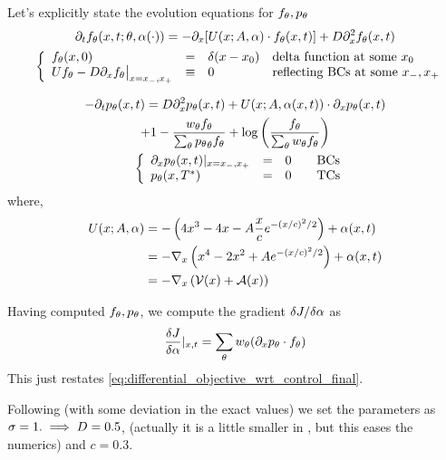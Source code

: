 \documentclass{article}
\begin{document}
Let's explicitly state the evolution equations for ${ f_{\theta}},{ p_{\theta}}$
\begin{equation}
\begin{gathered}
{\partial}_t { f_{\theta}}(x,t; {\theta}, {\alpha}(\cdot)) = -{\partial}_x [ U(x;A, {\alpha}) \cdot { f_{\theta}}(x,t)] + D {\partial}_x^2
{ f_{\theta}}(x,t)
\\
\begin{array}{ll}
	&
	\left\{ \begin{array}{lcll}
	 { f_{\theta}}(x,0) &=& \delta(x-x_0)  &\textrm{delta function at some } x_0
	\\
	U { f_{\theta}} - D {\partial}_x { f_{\theta}} \big|_{x={ x_{-} },{ x_{+} }} &\equiv& 0 & \textrm{reflecting BCs
	at some } { x_{-} }, { x_{+} } \end{array} \right.
\end{array}
\label{eq:forward_density_double_well}
\end{gathered}
\end{equation}

\begin{equation}
\begin{gathered}
-{\partial}_t { p_{\theta}}(x,t) =
D {\partial}_x^2 { p_{\theta}}(x,t) +
U(x;A, {\alpha}(x,t))\cdot {\partial}_x { p_{\theta}}(x,t) \\
+ 1 - \frac{  w_{\theta} { f_{\theta}} }{\sum_{\theta} { p_{\theta}}_{\theta}{ f_{\theta}}} 
+ \log\left(\frac{f_{\theta}} {\sum_{\theta} { w_{\theta} } { f_{\theta}} }\right)
\\
\begin{array}{ll}
	&
	\left\{ \begin{array}{lcll}
	{\partial}_x { p_{\theta}}(x, t)|_{x = { x_{-} }, { x_{+} }}  &=& 0  \quad &\textrm{BCs}
	\\
	{ p_{\theta}}(x,{ T^* })  &=& 0 \,& \textrm{TCs}
\end{array} \right.
\end{array}
\label{eq:backward_adjoint_double_well}
\end{gathered}
\end{equation}
where,  
\begin{eqnarray*}
U(x; A, {\alpha}) &= -\left( 4x^3 - 4x -A \frac xc e^{-(x/c)^2/2} \right) + {\alpha}(x,t)
\\
&= -{ \nabla }_x \left( x^4  - 2x^2 + A e^{-(x/c)^2/2} \right)  + {\alpha}(x,t)
\\
&= -{ \nabla }_x \left(\mathcal V(x) + \mathcal{A}(x) \right)
\end{eqnarray*}

Having computed ${ f_{\theta}}, { p_{\theta}}$, we compute the gradient $\delta J / \delta {\alpha}$
as
$$
\frac {\delta J}{\delta {\alpha}} |_{x,t} = \sum_{\theta} { w_{\theta} } ({\partial}_x { p_{\theta}} \cdot { f_{\theta}})
$$
This just restates \cref{eq:differential_objective_wrt_control_final}.

Following \cite{Lin} (with some deviation in the exact values) we set the
parameters as ${\sigma } = 1. \implies D = 0.5$, (actually it is a little smaller in
\cite{Lin}, but this eases the numerics) and $c = 0.3$.
\end{document}

